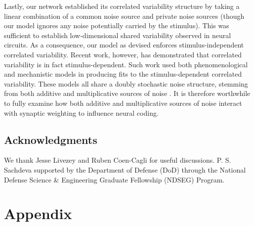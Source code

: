 \documentclass[12pt]{article}
\begin{document}
Lastly, our network established its correlated variability structure by taking a linear combination of a common noise source and private noise sources (though our model ignores any noise potentially carried by the stimulus). This was sufficient to establish low-dimensional shared variability observed in neural circuits. As a consequence, our model as devised enforces stimulus-independent correlated variability. Recent work, however, has demonstrated that correlated variability is in fact stimulus-dependent. Such work used both phenomenological \citep{lin2015, franke2016} and mechanistic \citep{zylberberg2016} models in producing fits to the stimulus-dependent correlated variability. These models all share a doubly stochastic noise structure, stemming from both additive and multiplicative sources of noise \citep{goris2014}. It is therefore worthwhile to fully examine how both additive and multiplicative sources of noise interact with synaptic weighting to influence neural coding.

\subsection*{Acknowledgments}
We thank Jesse Livezey and Ruben Coen-Cagli for useful discussions. P. S. Sachdeva supported by the Department of Defense (DoD) through the National Defense Science \& Engineering Graduate Fellowship (NDSEG) Program.

\section{Appendix}
\end{document}
